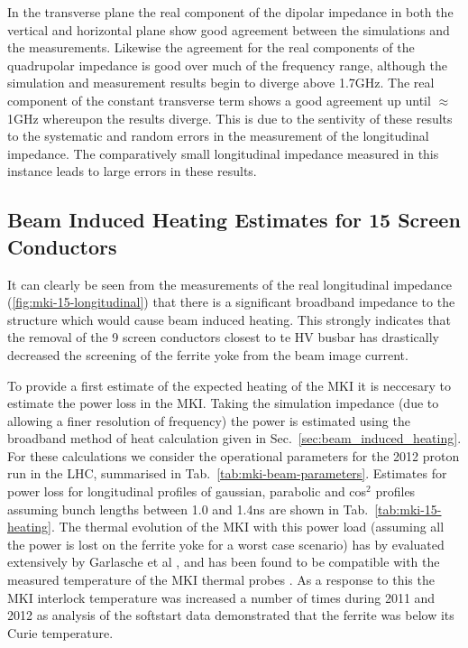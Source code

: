 In the transverse plane the real component of the dipolar impedance in both the vertical and horizontal plane show good agreement between the simulations and the measurements. Likewise the agreement for the real components of the quadrupolar impedance is good over much of the frequency range, although the simulation and measurement results begin to diverge above 1.7GHz. The real component of the constant transverse term shows a good agreement up until $\approx$ 1GHz whereupon the results diverge. This is due to the sentivity of these results to the systematic and random errors in the measurement of the longitudinal impedance. The comparatively small longitudinal impedance measured in this instance leads to large errors in these results. 

\subsection{Beam Induced Heating Estimates for 15 Screen Conductors}

It can clearly be seen from the measurements of the real longitudinal impedance (\ref{fig:mki-15-longitudinal}) that there is a significant broadband impedance to the structure which would cause beam induced heating. This strongly indicates that the removal of the 9 screen conductors closest to te HV busbar has drastically decreased the screening of the ferrite yoke from the beam image current.

To provide a first estimate of the expected heating of the MKI it is neccesary to estimate the power loss in the MKI. Taking the simulation impedance (due to allowing a finer resolution of frequency) the power is estimated using the broadband method of heat calculation given in Sec.~\ref{sec:beam_induced_heating}. For these calculations we consider the operational parameters for the 2012 proton run in the LHC, summarised in Tab.~\ref{tab:mki-beam-parameters}. Estimates for power loss for longitudinal profiles of gaussian, parabolic and cos$^{2}$ profiles assuming bunch lengths between 1.0 and 1.4ns are shown in Tab.~\ref{tab:mki-15-heating}. The thermal evolution of the MKI with this power load (assuming all the power is lost on the ferrite yoke for a worst case scenario) has by evaluated extensively by Garlasche et al \cite{Garlasche:2dHeat}, and has been found to be compatible with the measured temperature of the MKI thermal probes \cite{Barnes:mkiHeating}. As a response to this the MKI interlock temperature was increased a number of times during 2011 and 2012 as analysis of the softstart data demonstrated that the ferrite was below its Curie temperature.

